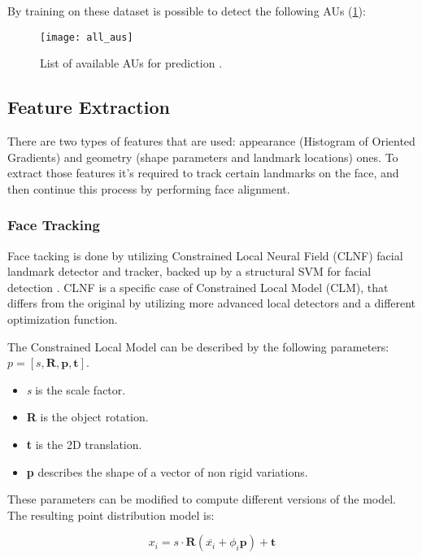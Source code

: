 By training on these dataset is possible to detect the following AUs (\ref{fig:all_AUs}):

\begin{figure}[H]
	\centering
	\texttt{[image: all\_aus]}
	\caption{List of available AUs for prediction \cite{Baltru2018}.}
	\label{fig:all_AUs}
\end{figure}

\subsection{Feature Extraction}
There are two types of features that are used: appearance (Histogram of Oriented Gradients) and geometry (shape parameters and landmark locations) ones. To extract those features it's required to track certain landmarks on the face, and then continue this process by performing face alignment.

\subsubsection{Face Tracking}
Face tacking is done by utilizing Constrained Local Neural Field (CLNF) facial landmark detector and tracker, backed up by a structural SVM for facial detection \cite{Baltru2013}.
CLNF is a specific case of Constrained Local Model (CLM), that differs from the original by utilizing more advanced local detectors and a different optimization function.

The Constrained Local Model can be described by the following parameters: \\
$p = [s, \mathbf{R}, \mathbf{p}, \mathbf{t}]$.
\begin{itemize}[noitemsep, topsep = -5pt]
	\item \textit{s} is the scale factor.
	\item \textbf{R} is the object rotation.
	\item \textbf{t} is the 2D translation.
	\item \textbf{p} describes the shape of a vector of non rigid variations.
\end{itemize}

These parameters can be modified to compute different versions of the model. The resulting point distribution model is:

\begin{equation} \label{eq:pdm}
	x_i = s \cdot \mathbf{R}(\overline{x_i} + \phi_i \mathbf{p}) + \mathbf{t}
\end{equation}

